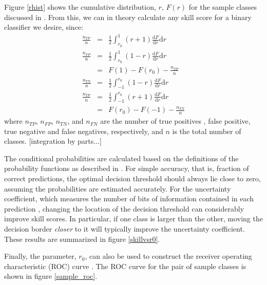 \documentclass{article}
\begin{document}
Figure \ref{rhist} shows the cumulative distribution,
$r$, $F(r)$ for the sample classes discussed in \citet{Mills2011}.  
From this, we can in theory
calculate any skill score for a binary classifier we desire, since:
\begin{eqnarray}
\frac{n_{TP}}{n} & = & \frac{1}{2}\int_{r_0}^{1} (r+1) 
		\frac{\mathrm d F}{\mathrm d r} \mathrm d r \\
\frac{n_{FP}}{n} & = & \frac{1}{2}\int_{r_0}^{1} (1-r) 
		\frac{\mathrm d F}{\mathrm d r} \mathrm d r \\
	& = & F(1) - F(r_0) - \frac{n_{TP}}{n} \\
\frac{n_{TN}}{n} & = & \frac{1}{2}\int_{-1}^{r_0} (1-r) 
		\frac{\mathrm d F}{\mathrm d r} \mathrm d r \\
\frac{n_{TP}}{n} & = & \frac{1}{2}\int_{-1}^{r_0} (r+1) 
		\frac{\mathrm d F}{\mathrm d r} \mathrm d r \\
	& = & F(r_0) - F(-1) - \frac{n_{TN}}{n} 
\end{eqnarray}
where $n_{TP}$, $n_{FP}$, $n_{TN}$, and $n_{FN}$ are the number of true positives
, false positive, true negative and false negatives, respectively, and $n$
is the total number of classes.
[integration by parts...]

The conditional probabilities are calculated based on the definitions of the
probability functions as described in \citet{Mills2011}.  For simple
accuracy, that is, fraction of correct predictions, the optimal decision
threshold should always lie close to zero, assuming the probabilities are
estimated accurately.  For the uncertainty coefficient, which measures the
number of bits of information contained in each prediction
\citep{Shannon, Press_etal1992, Mills2011}, changing the location of the
decision threshold can considerably improve skill scores.  In particular,
if one class is larger than the other, moving the decision border 
{\it closer} to it will typically improve the uncertainty coefficient.
These results are summarized in figure \ref{skillvsr0}.

Finally, the parameter, $r_0$, can also be used to construct 
the receiver operating characteristic (ROC) curve \citep{Jolliffe_Stephenson2003}.
The ROC curve for the pair of sample classes is shown in figure
\ref{sample_roc}.
\end{document}
